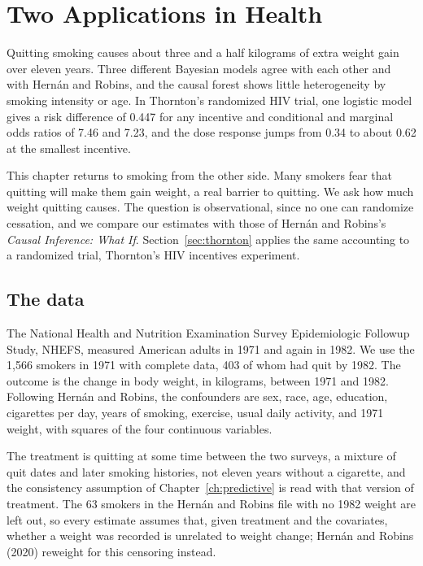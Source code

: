\chapter{Two Applications in Health}\label{ch:nhefs}

\begin{tcolorbox}[colback=gray!6,colframe=gray!50,title=In brief,fonttitle=\normalfont\itshape,coltitle=black,colbacktitle=gray!15,boxrule=0.4pt,arc=1pt]
Quitting smoking causes about three and a half kilograms of extra weight gain over eleven years. Three different Bayesian models agree with each other and with Hern\'an and Robins, and the causal forest shows little heterogeneity by smoking intensity or age. In Thornton's randomized HIV trial, one logistic model gives a risk difference of 0.447 for any incentive and conditional and marginal odds ratios of 7.46 and 7.23, and the dose response jumps from 0.34 to about 0.62 at the smallest incentive.
\end{tcolorbox}

This chapter returns to smoking from the other side. Many smokers fear that quitting will make them gain weight, a real barrier to quitting. We ask how much weight quitting causes. The question is observational, since no one can randomize cessation, and we compare our estimates with those of Hern\'an and Robins's \emph{Causal Inference: What If}. Section~\ref{sec:thornton} applies the same accounting to a randomized trial, Thornton's HIV incentives experiment.

\section{The data}

The National Health and Nutrition Examination Survey Epidemiologic Followup Study, NHEFS, measured American adults in 1971 and again in 1982. We use the 1,566 smokers in 1971 with complete data, 403 of whom had quit by 1982. The outcome is the change in body weight, in kilograms, between 1971 and 1982. Following Hern\'an and Robins, the confounders are sex, race, age, education, cigarettes per day, years of smoking, exercise, usual daily activity, and 1971 weight, with squares of the four continuous variables.

The treatment is quitting at some time between the two surveys, a mixture of quit dates and later smoking histories, not eleven years without a cigarette, and the consistency assumption of Chapter~\ref{ch:predictive} is read with that version of treatment. The 63 smokers in the Hern\'an and Robins file with no 1982 weight are left out, so every estimate assumes that, given treatment and the covariates, whether a weight was recorded is unrelated to weight change; Hern\'an and Robins (2020) reweight for this censoring instead.

